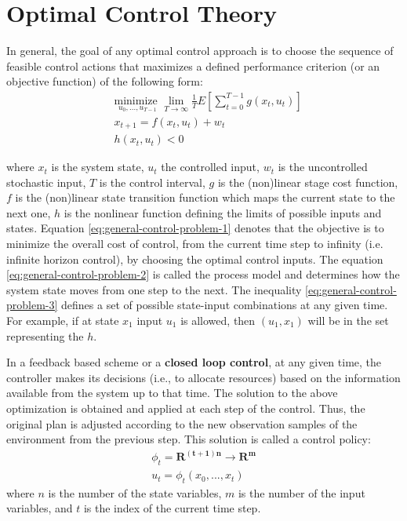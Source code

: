 \section{Optimal Control Theory}  
  In general, the goal of any optimal control approach is to choose the sequence of feasible control actions that maximizes a defined performance criterion (or an objective function) of the following form: 
 \begin{align}
   & \underset{u_0,...,u_{T-1}} {\text{minimize  } }  \lim_{T\to\infty}  \frac{1}{T} E\left[\sum_{t=0}^{T-1} g(x_t,u_t) \right]   \label{eq:general-control-problem-1} \\ 
   & x_{t+1}=f(x_t,u_t)+w_t  \label{eq:general-control-problem-2} \\ 
   & h(x_t,u_t)  < 0 \label{eq:general-control-problem-3} 
  \end{align}
  
  where $x_t$ is the system state,
  $u_t$ the controlled input, 
  $w_t$ is the uncontrolled stochastic input, 
  $T$ is the control interval, 
  $g$ is the (non)linear stage cost function, 
  $f$ is the (non)linear  state transition function  which maps the current state to the next one,   
  $h$ is the nonlinear function defining the limits of possible inputs and states.      
  Equation \ref{eq:general-control-problem-1}  denotes that the objective is to minimize the overall cost of control, from the current time step to infinity (i.e. infinite horizon control), by choosing the optimal control inputs. The equation \ref{eq:general-control-problem-2}  is called the process model and determines how the system state moves from one step to the next. 
  The inequality \ref{eq:general-control-problem-3}  defines a set of possible state-input combinations at any given time. For example, if at state $x_1$  input $u_1$  is allowed,  then $(u_1,x_1)$  will be in the set representing the $h$.   
  
In a feedback based scheme or a \textbf{closed loop control}, at any given time, the controller makes its decisions (i.e., to allocate resources) based on the information available from the system up to that time. %
   The solution to the above optimization is obtained and applied at each step of the control. Thus, the original plan is adjusted according to the new observation samples of the environment from the previous step. This solution is called a control policy: 
  \begin{align}
  \phi_t=\mathbf{R^{(t+1)n}}\to \mathbf{R^{m}}   \nonumber \\ 
  u_t=\phi_t(x_0,...,x_t) \nonumber
  \end{align}
  where $n$ is the number of the state variables, $m$ is the number of the input variables, and $t$ is the index of the current time step.

